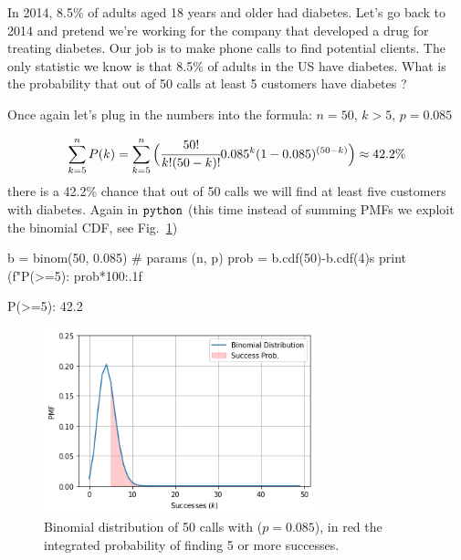 In 2014, 8.5\% of adults aged 18 years and older had diabetes. Let's go back to 2014 and pretend we're working for the company that developed a drug for treating diabetes. Our job is to make phone calls to find potential clients. The only statistic we know is that 8.5\% of adults in the US have diabetes. What is the probability that out of 50 calls at least 5 customers have diabetes ? 

Once again let's plug in the numbers into the formula: \(n = 50\), \(k > 5\), \(p = 0.085\)

\[\sum_{k=5}^{n}P(k) = \sum_{k=5}^{n}\Big(\cfrac{50!}{k!(50 - k)!}0.085^{k}(1-0.085)^{(50-k)}\Big) \approx 42.2\% \]
there is a 42.2\% chance that out of 50 calls we will find at least five customers with diabetes. Again in \(\tt{python}\) (this time instead of summing PMFs we exploit the binomial CDF, see Fig.~\ref{fig:binomial_cdf})

\begin{ipython}
b = binom(50, 0.085) # params (n, p)
prob = b.cdf(50)-b.cdf(4)s
print (f"P(>=5): {prob*100:.1f}%

P(>=5): 42.2%
\end{ipython}

\begin{figure}[htb]
\centering
\includegraphics[width=0.7\textwidth]{figures/binomial_5_0.png}
\caption{Binomial distribution of 50 calls with ($p=0.085$), in red the integrated probability of finding 5 or more successes.}
\label{fig:binomial_cdf}
\end{figure}
